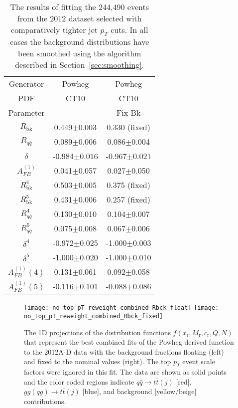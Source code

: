 \documentclass{cmspaperpdf}
\begin{document}
\begin{table}[hbt]
\begin{center}
\caption{\small \label{tab:no_pT_reweighting_data} The results of fitting the 244,490 events from the 2012 dataset selected with comparatively tighter jet $p_{T}$ cuts. In all cases the background distributions have been smoothed using the algorithm described in Section~\ref{sec:smoothing}.}
\vspace{3pt}
\begin{tabular}{|c|c|c|}\hline
Generator          & Powheg           & Powheg           \\
   PDF             & CT10             & CT10             \\
Parameter          &                  & Fix Bk           \\
\hline
$R_\mathrm{bk}$    & 0.449$\pm$0.003  & 0.330 (fixed)    \\
$R_{q\bar q}$      & 0.089$\pm$0.006  & 0.086$\pm$0.004  \\
$\delta$           & -0.984$\pm$0.016 & -0.967$\pm$0.021 \\
$A^{(1)}_{FB}$     & 0.041$\pm$0.057  & 0.027$\pm$0.050  \\
\hline
$R^4_\mathrm{bk}$  & 0.503$\pm$0.005  & 0.375 (fixed)    \\
$R^5_\mathrm{bk}$  & 0.431$\pm$0.006  & 0.257 (fixed)    \\
$R^4_{q\bar q}$    & 0.130$\pm$0.010  & 0.104$\pm$0.007  \\
$R^5_{q\bar q}$    & 0.075$\pm$0.008  & 0.067$\pm$0.006  \\
$\delta^4$         & -0.972$\pm$0.025 & -1.000$\pm$0.003 \\
$\delta^5$         & -1.000$\pm$0.020 & -1.000$\pm$0.010 \\
$A^{(1)}_{FB}(4)$  & 0.131$\pm$0.061  & 0.092$\pm$0.058  \\
$A^{(1)}_{FB}(5)$  & -0.116$\pm$0.101 & -0.088$\pm$0.086 \\
\hline
\end{tabular}
\end{center}
\end{table}

 \begin{figure}[hbt]
  \begin{center}
    \texttt{[image: no\_top\_pT\_reweight\_combined\_Rbck\_float]}
    \texttt{[image: no\_top\_pT\_reweight\_combined\_Rbck\_fixed]}
  \caption{\small The 1D projections of the distribution functions $f(x_\mathrm{r},M_\mathrm{r},c_\mathrm{r},Q,N)$ that represent the best combined fits of the Powheg derived function to the 2012A-D data with the background fractions floating (left) and fixed to the nominal values (right). The top $p_{T}$ event scale factors were ignored in this fit. The data are shown as solid points and the color coded regions indicate $q\bar q\to t\bar t(j)$ [red], $gg(qg)\to t\bar t(j)$ [blue], and background [yellow/beige] contributions.}
    \label{fig:no_pT_reweighting_fits}
  \end{center}
\end{figure}
\end{document}
